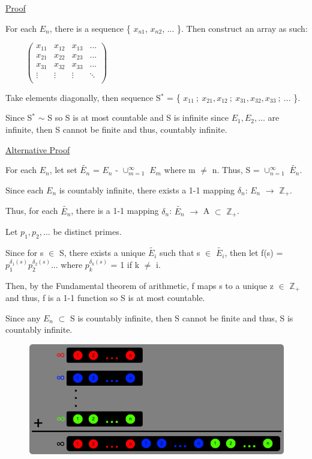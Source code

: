 { \color{magenta} \underline{Proof} } 
	
	For each $E_n$, there is a sequence \{ $x_{n1}$, $x_{n2}$, ... \}.
	Then construct an array as such:

	$ \hspace{1cm}
	\left(
	\begin{array}{cccc}
		x_{11} & x_{12} & x_{13} & ... \\
		x_{21} & x_{22} & x_{23} & ... \\
		x_{31} & x_{32} & x_{33} & ... \\
		\vdots & \vdots & \vdots & \ddots \\
	\end{array}
	\right)
	$
		
	Take elements diagonally, then sequence S$^*$ =
	\{ $x_{11} \ ; \ x_{21}, x_{12} \ ; \ x_{31}, x_{32}, x_{33} \ ; \ ... $ \}.
		
	\begin{adjustbox}{minipage=15cm, right}
		Since S$^*$ $\sim$ S so S is at most countable and S is infinite since
		$E_1, E_2, ...$ are infinite, then S cannot be finite and thus, countably infinite.
	\end{adjustbox}

{ \color{magenta} \underline{Alternative Proof} } 

	For each $E_n$, let set $\widetilde{E_n}$ = $E_n$ - $\cup_{m=1}^{\infty}$ $E_m$ where
	m $\neq$ n. Thus, S = $\cup_{n=1}^{\infty}$ $\widetilde{E_n}$.

	Since each $E_n$ is countably infinite, there exists a 1-1 mapping
	$\delta_n$: $E_n$ $\rightarrow$ $\mathbb{Z}_+$.

	Thus, for each $\widetilde{E_n}$, there is a 1-1 mapping
	$\delta_n$: $\widetilde{E_n}$ $\rightarrow$ A $\subset$ $\mathbb{Z}_+$.

	Let $p_1, p_2, ... $ be distinct primes.

	Since for s $\in$ S, there exists a unique $\widetilde{E_i}$ such that
	s $\in$ $\widetilde{E_i}$, then let f(s) = $p_1^{\delta_1(s)} p_2^{\delta_2(s)}...$
	where $p_k^{\delta_k(s)}$ = 1 if k $\neq$ i.

	Then, by the Fundamental theorem of arithmetic, f maps s to a unique z $\in$ $\mathbb{Z}_+$
	and thus, f is a 1-1 function so S is at most countable.

	Since any $E_n$ $\subset$ S is countably infinite, then S cannot be finite
	and thus, S is countably infinite.

\begin{figure}[h]
	\centering
	\includegraphics[scale=0.5]{Images/5.1.2.png}
\end{figure}

